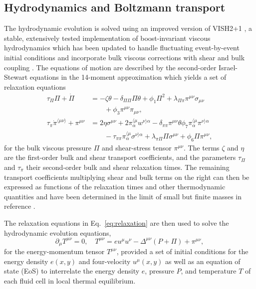 \documentclass[aps,prc,reprint,amsmath,nofootinbib,superscriptaddress]{revtex4-1}
\begin{document}
\subsection{Hydrodynamics and Boltzmann transport}

The hydrodynamic evolution is solved using an improved version of VISH2+1 \cite{Song:2007ux}, a stable, extensively tested implementation of boost-invariant viscous hydrodynamics which has been updated to handle fluctuating event-by-event initial conditions \cite{Shen:2014vra} and incorporate bulk viscous corrections with shear and bulk coupling \cite{Denicol:2014vaa}.
The equations of motion are described by the second-order Israel-Stewart equations in the 14-moment approximation \cite{Israel:1979wp,Israel:1976aa} which yields a set of relaxation equations
\begin{subequations}
  \begin{align}
    \tau_\Pi \Pi + \dot{\Pi} &=
      -\zeta \theta - \delta_{\Pi\Pi} \Pi\theta + \phi_1 \Pi^2
      + \lambda_{\Pi\pi} \pi^{\mu\nu} \sigma_{\mu\nu} \nonumber \\
      &\qquad + \phi_3 \pi^{\mu\nu}\pi_{\mu\nu}, \\
    \tau_\pi \dot{\pi}^{\langle \mu\nu \rangle} + \pi^{\mu\nu} &=
      2\eta\sigma^{\mu\nu} + 2\pi_\alpha^{\langle \mu} w^{\nu \rangle \alpha}
      - \delta_{\pi\pi} \pi^{\mu\nu} \theta \phi_7 \pi_\alpha^{\langle \mu}
        \pi^{\nu \rangle \alpha} \nonumber \\
      &\qquad - \tau_{\pi\pi} \pi_\alpha^{\langle \mu}\sigma^{\nu \rangle \alpha}
      + \lambda_{\pi\Pi} \Pi \sigma^{\mu\nu} + \phi_6 \Pi \pi^{\mu\nu},
  \end{align}
  \label{eq:relaxation}
\end{subequations}
for the bulk viscous pressure $\Pi$ and shear-stress tensor $\pi^{\mu\nu}$.
The terms $\zeta$ and $\eta$ are the first-order bulk and shear transport coefficients, and the parameters $\tau_\Pi$ and $\tau_\pi$ their second-order bulk and shear relaxation times.
The remaining transport coefficients multiplying shear and bulk terms on the right can then be expressed as functions of the relaxation times and other thermodynamic quantities and have been determined in the limit of small but finite masses in reference \cite{Denicol:2014vaa}.

The relaxation equations in Eq.~\eqref{eq:relaxation} are then used to solve the hydrodynamic evolution equations,
\begin{equation}
  \partial_\mu T^{\mu\nu} = 0, \quad T^{\mu\nu} = e u^\mu u^\nu  - \Delta^{\mu\nu} (P + \Pi) + \pi^{\mu\nu},
  \label{eq:conservation}
\end{equation}
for the energy-momentum tensor $T^{\mu\nu}$, provided a set of initial conditions for the energy density $e(x,y)$ and four-velocity $u^\mu(x,y)$ as well as an equation of state (EoS) to interrelate the energy density $e$, pressure $P$, and temperature $T$ of each fluid cell in local thermal equilibrium.
\end{document}
